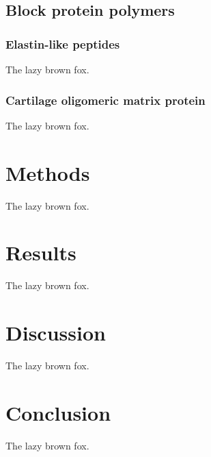 \subsection{Block protein polymers} \subsubsection{Elastin-like
peptides} The lazy brown fox.

\subsubsection{Cartilage oligomeric matrix protein} The lazy brown
fox.

\section{Methods} The lazy brown fox.

\section{Results} The lazy brown fox.

\section{Discussion} The lazy brown fox.

\section{Conclusion} The lazy brown fox.
\printbibliography
